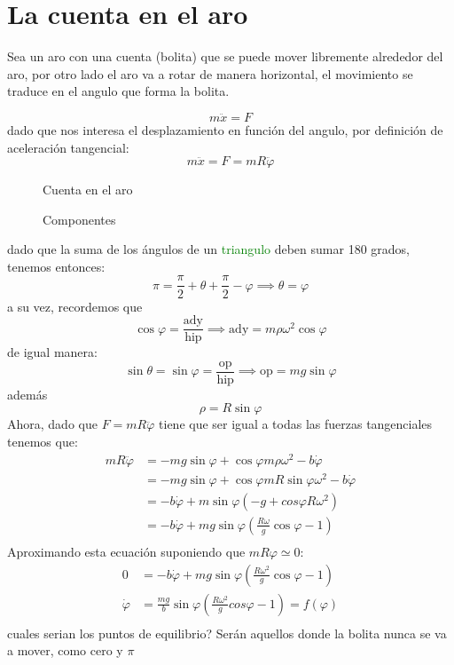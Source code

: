 \section{La cuenta en el aro}

Sea un aro con una cuenta (bolita) que se puede mover libremente alrededor del aro, por otro lado el aro va a rotar de manera horizontal, el movimiento se traduce en el angulo que forma la bolita.

$$
m\ddot{x}=F
$$
dado que nos interesa el desplazamiento en función del angulo, por definición de aceleración tangencial:
$$
m\ddot{x}=F=mR \ddot{\varphi}
$$
\begin{figure}[ht]
    \centering
    \caption{Cuenta en el aro}
    \label{fig:cuenta-en-el-aro}
\end{figure}

\begin{figure}[ht]
    \centering
    \caption{Componentes}
    \label{fig:detalles}
\end{figure}

dado que la suma de los ángulos de un \textcolor{Green}{triangulo} deben sumar 180 grados, tenemos entonces:
$$
\pi = \frac{\pi}{2} + \theta + \frac{\pi}{2}-\varphi \implies \theta=\varphi
$$
a su vez, recordemos que $$
\cos\varphi=\frac{\text{ady}}{\text{hip}} \implies \text{ady} = m\rho\omega^2\cos\varphi
$$
de igual manera:
$$
\sin\theta=  \sin\varphi=\frac{\text{op}}{\text{hip}} \implies \text{op}=mg\sin\varphi 
$$
además $$
\rho = R\sin\varphi
$$
Ahora, dado que $F=mR \ddot{\varphi}$ tiene que ser igual a todas las fuerzas tangenciales tenemos que:
$$
\begin{aligned}
  mR \ddot{\varphi} &= -mg\sin\varphi+\cos\varphi m \rho \omega^2 - b \dot{\varphi} \\
		    &= -mg\sin\varphi+\cos\varphi m R \sin\varphi\omega^2 - b \dot{\varphi} \\
		    &= -b \dot{\varphi}+m\sin\varphi \left( -g + cos\varphi R \omega^2 \right)  \\
		    &= -b \dot{\varphi}+mg\sin\varphi \left( \frac{R\omega}{g}\cos\varphi - 1 \right) 	 \\ 
\end{aligned}
$$
Aproximando esta ecuación suponiendo que $mR\varphi \simeq 0$:
$$
\begin{aligned}
  0 &= -b\dot{\varphi}+mg\sin\varphi \left( \frac{R\omega^2}{g}\cos\varphi-1 \right)   \\
  \dot{\varphi} &= \frac{mg}{b}\sin\varphi \left( \frac{R\omega^2}{g}cos\varphi-1 \right)=f(\varphi)   \\ 
\end{aligned}
$$
cuales serian los puntos de equilibrio? Serán aquellos donde la bolita nunca se va a mover, como cero y $\pi$

